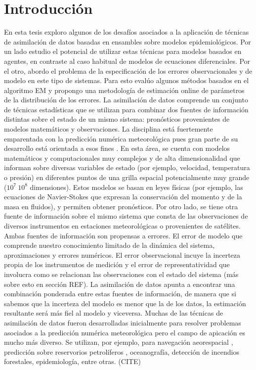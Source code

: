 \chapter{Introducción}
En esta tesis exploro algunos de los desafíos asociados a la aplicación de técnicas de asimilación de datos basadas en ensambles sobre modelos epidemiológicos. Por un lado estudio el potencial de utilizar estas técnicas para modelos basados en agentes, en contraste al caso habitual de modelos de ecuaciones diferenciales. Por el otro, abordo el problema de la especificación de los errores observacionales y de modelo en este tipo de sistemas. Para esto evalúo algunos métodos basados en el algoritmo EM y propongo una metodología de estimación online de parámetros de la distribución de los errores.
La asimilación de datos comprende un conjunto de técnicas estadísticas que se utilizan para combinar dos fuentes de información distintas sobre el estado de un mismo sistema: pronósticos provenientes de modelos matemáticos y observaciones. La disciplina está fuertemente emparentada con la predicción numérica meteorológica pues gran parte de su desarrollo está orientada a esos fines \citep{Talagrand1987}. En esta área, se cuenta con modelos matemáticos y computacionales muy complejos y de alta dimensionalidad que informan sobre diversas variables de estado (por ejemplo, velocidad, temperatura o presión) en diferentes puntos de una grilla espacial potencialmente muy grande ($10^7~10^8$ dimensiones). Estos modelos se basan en leyes físicas (por ejemplo, las ecuaciones de Navier-Stokes que expresan la conservación del momento y de la masa en fluidos), y permiten obtener pronósticos. Por otro lado, se tiene otra fuente de información sobre el mismo sistema que consta de las observaciones de diversos instrumentos en estaciones meteorológicas o provenientes de satélites. Ambas fuentes de información son propensas a errores. El error de modelo que comprende nuestro conocimiento limitado de la dinámica del sistema, aproximaciones y errores numéricos. El error observacional incuye la incerteza propia de los instrumentos de medición y el error de representatividad que involucra como se relacionan las observaciones con el estado del sistema (más sobre esto en sección REF). La asimilación de datos apunta a encontrar una combinación ponderada entre estas fuentes de información, de manera que si sabemos que la incerteza del modelo es menor que la de los datos, la estimación resultante será más fiel al modelo y viceversa. Muchas de las técnicas de asimilación de datos fueron desarrolladas inicialmente para resolver problemas asociados a la predicción numérica meteorológica pero el campo de apicación es mucho más diverso. Se utilizan, por ejemplo, para navegación aeorespacial \cite{Grewal2010}, predicción sobre reservorios petrolíferos \cite{Aanonsen2009}, oceanografía, detección de incendios forestales, epidemiología, entre otras. (CITE) 

